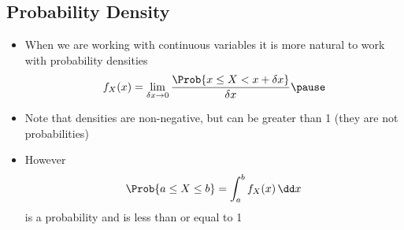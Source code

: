 
\begin{slide}
\section{Probability Density}

\begin{PauseHighLight}
  \begin{itemize}
  \item When we are working with continuous variables it is more natural
    to work with probability densities
    \begin{align*}
      f_X(x) = \lim_{\delta x \rightarrow 0} \frac{\Prob{x\leq X < x +
      \delta x}}{\delta x}\pause
    \end{align*}
  \item Note that densities are non-negative, but can be greater than
    1 (they are not probabilities)\pause
  \item However
    \begin{align*}
      \Prob{a\leq X \leq b} = \int_a^b f_X(x)\, \dd x
    \end{align*}
  is a probability and is less than or equal to 1\pause
  \end{itemize}
\end{PauseHighLight}

\end{slide}


